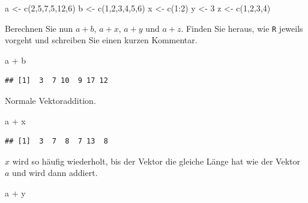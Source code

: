 \documentclass[12pt,a4paper]{article}
\newenvironment{Shaded}{\begin{snugshade}}{\end{snugshade}}
\newcommand{\DecValTok}[1]{\textcolor[rgb]{0.00,0.00,0.81}{#1}}
\newcommand{\FunctionTok}[1]{\textcolor[rgb]{0.00,0.00,0.00}{#1}}
\newcommand{\NormalTok}[1]{#1}
\newcommand{\OtherTok}[1]{\textcolor[rgb]{0.56,0.35,0.01}{#1}}
\newcommand{\SpecialCharTok}[1]{\textcolor[rgb]{0.00,0.00,0.00}{#1}}
\begin{document}
\begin{Shaded}
\begin{Highlighting}[]
\NormalTok{    a }\OtherTok{\textless{}{-}} \FunctionTok{c}\NormalTok{(}\DecValTok{2}\NormalTok{,}\DecValTok{5}\NormalTok{,}\DecValTok{7}\NormalTok{,}\DecValTok{5}\NormalTok{,}\DecValTok{12}\NormalTok{,}\DecValTok{6}\NormalTok{)}
\NormalTok{    b }\OtherTok{\textless{}{-}} \FunctionTok{c}\NormalTok{(}\DecValTok{1}\NormalTok{,}\DecValTok{2}\NormalTok{,}\DecValTok{3}\NormalTok{,}\DecValTok{4}\NormalTok{,}\DecValTok{5}\NormalTok{,}\DecValTok{6}\NormalTok{)}
\NormalTok{    x }\OtherTok{\textless{}{-}} \FunctionTok{c}\NormalTok{(}\DecValTok{1}\SpecialCharTok{:}\DecValTok{2}\NormalTok{)}
\NormalTok{    y }\OtherTok{\textless{}{-}} \DecValTok{3}
\NormalTok{    z }\OtherTok{\textless{}{-}} \FunctionTok{c}\NormalTok{(}\DecValTok{1}\NormalTok{,}\DecValTok{2}\NormalTok{,}\DecValTok{3}\NormalTok{,}\DecValTok{4}\NormalTok{)}
\end{Highlighting}
\end{Shaded}

Berechnen Sie nun \(a+b\), \(a+x\), \(a+y\) und \(a+z\). Finden Sie
heraus, wie \texttt{R} jeweils vorgeht und schreiben Sie einen kurzen
Kommentar.

\begin{Shaded}
\begin{Highlighting}[]
\NormalTok{    a }\SpecialCharTok{+}\NormalTok{ b }
\end{Highlighting}
\end{Shaded}

\begin{verbatim}
## [1]  3  7 10  9 17 12
\end{verbatim}

Normale Vektoraddition.

\begin{Shaded}
\begin{Highlighting}[]
\NormalTok{    a }\SpecialCharTok{+}\NormalTok{ x}
\end{Highlighting}
\end{Shaded}

\begin{verbatim}
## [1]  3  7  8  7 13  8
\end{verbatim}

\(x\) wird so häufig wiederholt, bis der Vektor die gleiche Länge hat
wie der Vektor \(a\) und wird dann addiert.

\begin{Shaded}
\begin{Highlighting}[]
\NormalTok{    a }\SpecialCharTok{+}\NormalTok{ y}
\end{Highlighting}
\end{Shaded}
\end{document}
